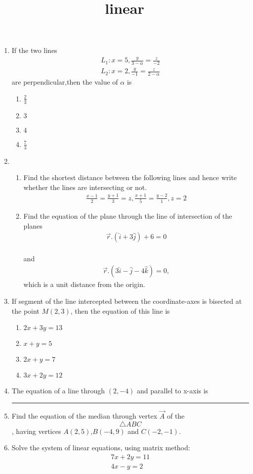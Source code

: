 \documentclass{article}
\title{linear}
\begin{document}
\begin{enumerate}
	\item If the two lines
	\begin{align}	
		L_{1} : x=5, \frac{y}{3-\alpha} = \frac{z}{-2}
		\\L_{2}: x=2, \frac{y}{-1} = \frac{z}{2-\alpha}
	\end{align}
   	 are perpendicular,then the value of $\alpha$ is
   	\begin{enumerate}%
   		\item $\frac{2}{3}$
		\item $3$
		\item $4$
		\item $\frac{7}{3}$
	\end{enumerate}
	\item \begin{enumerate} %
	\item Find the shortest distance between the following lines and hence write whether the lines are intersecting or not.
	\begin{align}
		\frac{x-1}{2} = \frac{y+1}{3}=z,
		\frac{x+1}{5} = \frac{y-2}{1}, 
		z=2
	\end{align}
	\item Find the equation of the plane through the line of intersection of the planes 
		\begin{align}
			\vec{r}. (\hat{i}+3\hat{j}) + 6 = 0
		\end{align}
			\\and
			\begin{align}
				\vec{r} .(3\hat{i}-\hat{j}-4\hat{k}) = 0,
			\end{align}
			which is a unit distance from the origin.
	\end{enumerate}
\item If segment of the line intercepted between the coordinate-axes is bisected at the point $M(2,3)$, then the equation of this line is
		\begin{enumerate}%
			\item $2x + 3y = 13$
			\item $x+y = 5$
			\item $2x + y = 7$
			\item $3x + 2y = 12$
		\end{enumerate}
	\item The equation of a line through $(2,-4)$ and parallel to x-axis is\rule{1cm}{0.15mm}
	\item Find the equation of the median through vertex $\vec{A}$ of the $$\triangle{ABC}$$, having vertices $A(2,5)$,$B(-4,9)$ and $C(-2,-1)$.
	\item Solve the system of linear equations, using matrix method:
		\begin{align}	
			7x+2y = 11
			\\4x-y = 2
		\end{align}
\end{enumerate}
\end{document}
